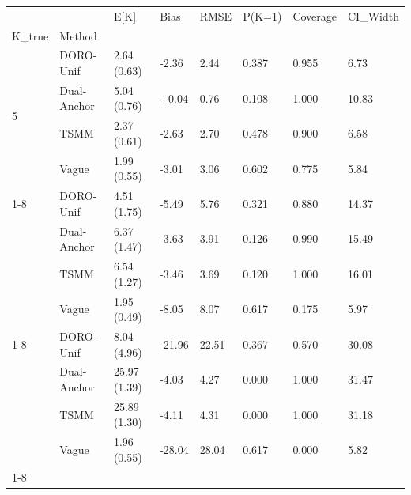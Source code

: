 \begin{tabular}{llllllll}
\toprule
 &  & E[K] & Bias & RMSE & P(K=1) & Coverage & CI_Width \\
K_true & Method &  &  &  &  &  &  \\
\midrule
\multirow[t]{4}{*}{5} & DORO-Unif & 2.64 (0.63) & -2.36 & 2.44 & 0.387 & 0.955 & 6.73 \\
 & Dual-Anchor & 5.04 (0.76) & +0.04 & 0.76 & 0.108 & 1.000 & 10.83 \\
 & TSMM & 2.37 (0.61) & -2.63 & 2.70 & 0.478 & 0.900 & 6.58 \\
 & Vague & 1.99 (0.55) & -3.01 & 3.06 & 0.602 & 0.775 & 5.84 \\
\cline{1-8}
\multirow[t]{4}{*}{10} & DORO-Unif & 4.51 (1.75) & -5.49 & 5.76 & 0.321 & 0.880 & 14.37 \\
 & Dual-Anchor & 6.37 (1.47) & -3.63 & 3.91 & 0.126 & 0.990 & 15.49 \\
 & TSMM & 6.54 (1.27) & -3.46 & 3.69 & 0.120 & 1.000 & 16.01 \\
 & Vague & 1.95 (0.49) & -8.05 & 8.07 & 0.617 & 0.175 & 5.97 \\
\cline{1-8}
\multirow[t]{4}{*}{30} & DORO-Unif & 8.04 (4.96) & -21.96 & 22.51 & 0.367 & 0.570 & 30.08 \\
 & Dual-Anchor & 25.97 (1.39) & -4.03 & 4.27 & 0.000 & 1.000 & 31.47 \\
 & TSMM & 25.89 (1.30) & -4.11 & 4.31 & 0.000 & 1.000 & 31.18 \\
 & Vague & 1.96 (0.55) & -28.04 & 28.04 & 0.617 & 0.000 & 5.82 \\
\cline{1-8}
\bottomrule
\end{tabular}

